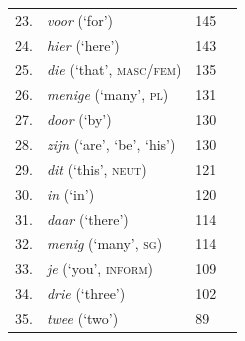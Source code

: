 \documentclass[11pt]{article}
\begin{document}
\begin{table}[htbp]
{\begin{tabular}[t]{@{}llll@{}}
23. & \textit{voor} (‘for’) & 145 \\
24. & \textit{hier} (‘here’) & 143 \\
25. & \textit{die} (‘that’, \textsc{masc/fem}) & 135 \\
26. & \textit{menige} (‘many’, \textsc{pl}) & 131 \\
27. & \textit{door} (‘by’) & 130 \\
28. & \textit{zijn} (‘are’, ‘be’, ‘his’) & 130 \\
29. & \textit{dit} (‘this’, \textsc{neut}) & 121 \\
30. & \textit{in} (‘in’) & 120 \\
31. & \textit{daar} (‘there’) & 114 \\
32. & \textit{menig} (‘many’, \textsc{sg}) & 114 \\
33. & \textit{je} (‘you’, \textsc{inform}) & 109 \\
34. & \textit{drie} (‘three’) & 102 \\
35. & \textit{twee} (‘two’) & 89 \\ \hline
\end{tabular}
}
\end{table}
\end{document}
